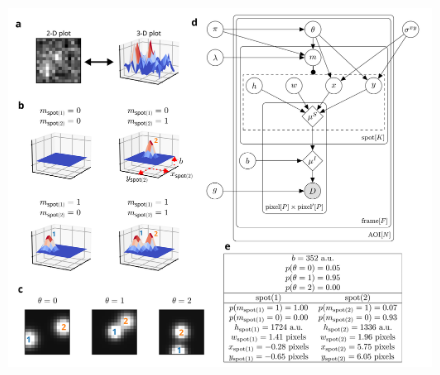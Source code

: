 \begin{figure}[h]
\centering
\includegraphics[width=\textwidth]{figures/figure2/figure2.png}
\label{fig:tapqir_model}
\end{figure}

